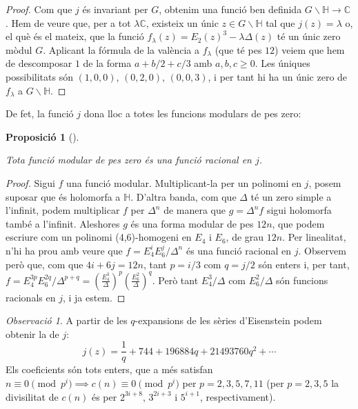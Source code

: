\documentclass[
  letterpaper,
  DIV=11,
  numbers=noendperiod]{scrreprt}
\theoremstyle{plain}
\theoremstyle{plain}
\theoremstyle{definition}
\theoremstyle{plain}
\newtheorem{proposition}{Proposició}[chapter]
\theoremstyle{plain}
\theoremstyle{definition}
\theoremstyle{remark}
\newtheorem{refremark}{Observació}[chapter]
\begin{document}
\begin{proof}
Com que \(j\) és invariant per \(G\), obtenim una funció ben definida
\(G\backslash \mathbb{H}\longrightarrow\mathbb{C}\). Hem de veure que,
per a tot \(\lambda\mathbb{C}\), existeix un únic
\(z\in G\backslash\mathbb{H}\) tal que \(j(z)=\lambda\) o, el què és el
mateix, que la funció \(f_\lambda(z)=E_2(z)^3 - \lambda\Delta(z)\) té un
únic zero mòdul \(G\). Aplicant la fórmula de la valència a
\(f_\lambda\) (que té pes \(12\)) veiem que hem de descomposar \(1\) de
la forma \(a + b/2 + c/3\) amb \(a,b,c\geq 0\). Les úniques
possibilitats són \((1,0,0)\), \((0,2,0)\), \((0,0,3)\), i per tant hi
ha un únic zero de \(f_\lambda\) a \(G\backslash\mathbb{H}\).
\end{proof}

De fet, la funció \(j\) dona lloc a totes les funcions modulars de pes
zero:

\begin{proposition}[]\protect\hypertarget{prp-}{}\label{prp-}

Tota funció modular de pes zero és una funció racional en \(j\).

\end{proposition}

\begin{proof}
Sigui \(f\) una funció modular. Multiplicant-la per un polinomi en
\(j\), posem suposar que és holomorfa a \(\mathbb{H}\). D'altra banda,
com que \(\Delta\) té un zero simple a l'infinit, podem multiplicar
\(f\) per \(\Delta^n\) de manera que \(g=\Delta^nf\) sigui holomorfa
també a l'infinit. Aleshores \(g\) és una forma modular de pes \(12n\),
que podem escriure com un polinomi (4,6)-homogeni en \(E_4\) i \(E_6\),
de grau \(12n\). Per linealitat, n'hi ha prou amb veure que
\(f=E_4^iE_6^j/\Delta^n\) és una funció racional en \(j\). Observem però
que, com que \(4i+6j=12n\), tant \(p=i/3\) com \(q=j/2\) són enters i,
per tant,
\(f=E_4^{3p}E_6^{2q}/\Delta^{p+q}=(\frac{E_4^3}{\Delta})^p(\frac{E_6^2}{\Delta})^q\).
Però tant \(E_4^3/\Delta\) com \(E_6^2/\Delta\) són funcions racionals
en \(j\), i ja estem.
\end{proof}

\begin{refremark}
A partir de les \(q\)-expansions de les sèries d'Eisenstein podem
obtenir la de \(j\): \[
j(z)=\frac{1}{q} + 744 + 196884q + 21493760q^2+\cdots
\] Els coeficients són tots enters, que a més satisfan
\(n\equiv 0\pmod{p^i}\implies c(n) \equiv 0 \pmod{p^i}\) per
\(p=2,3,5,7,11\) (per \(p=2,3,5\) la divisilitat de \(c(n)\) és per
\(2^{3i+8}\), \(3^{2i+3}\) i \(5^{i+1}\), respectivament).

\label{rem-}

\end{refremark}
\end{document}
